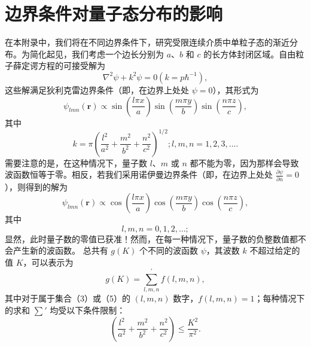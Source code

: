 ﻿\section{边界条件对量子态分布的影响}\label{ux8fb9ux754cux6761ux4ef6ux5bf9ux91cfux5b50ux6001ux5206ux5e03ux7684ux5f71ux54cd}

在本附录中，我们将在不同边界条件下，研究受限连续介质中单粒子态的渐近分布。为简化起见，我们考虑一个边长分别为 \(a\)、\(b\) 和 \(c\) 的长方体封闭区域。自由粒子薛定谔方程的可接受解为
\begin{equation}\tag{17.1.1}\label{eq:17.1.1}
\nabla ^{2} \psi + k ^{2} \psi = 0  \left( k = p \hbar ^{- 1} \right) ,
\end{equation}
这些解满足狄利克雷边界条件（即，在边界上处处 \(\psi=0\)），其形式为
\begin{equation}\tag{17.1.2}\label{eq:17.1.2}
\psi _ { l m n } ( \pmb { r } ) \propto \sin \left( \frac { l \pi x } { a } \right) \sin \left( \frac { m \pi y } { b } \right) \sin \left( \frac { n \pi z } { c } \right) ,
\end{equation}
其中
\begin{equation}\tag{17.1.3}\label{eq:17.1.3}
k = \pi \left( \frac { l ^{2} } { a ^{2} } + \frac { m ^{2} } { b ^{2} } + \frac { n ^{2} } { c ^{2} } \right) ^{1 / 2} ;  l , m , n = 1 , 2 , 3 , \ldots .
\end{equation}
需要注意的是，在这种情况下，量子数 \(l\)、\(m\) 或 \(n\) 都不能为零，因为那样会导致波函数恒等于零。相反，若我们采用诺伊曼边界条件（即，在边界上处处 \(\frac{\partial\psi}{\partial n}=0\)），则得到的解为
\begin{equation}\tag{17.1.4}\label{eq:17.1.4}
\psi _ { l m n } ( \pmb { r } ) \propto \cos \left( \frac { l \pi x } { a } \right) \cos \left( \frac { m \pi y } { b } \right) \cos \left( \frac { n \pi z } { c } \right) ,
\end{equation}
其中
\begin{equation}\tag{17.1.5}\label{eq:17.1.5}
l , m , n = 0 , 1 , 2 , \ldots ;
\end{equation}
显然，此时量子数的零值已获准！然而，在每一种情况下，量子数的负整数值都不会产生新的波函数。
总共有 \(g(K)\) 个不同的波函数 \(\psi\)，其波数 \(k\) 不超过给定的值 \(K\)，可以表示为
\begin{equation}\tag{17.1.6}\label{eq:17.1.6}
g ( K ) = \sum _ { l , m , n } ^{\prime} f ( l , m , n ) ,
\end{equation}
其中对于属于集合（3）或（5）的 \((l,m,n)\) 数字，\(f(l,m,n)=1\)；每种情况下的求和 \(\sum'\) 均受以下条件限制：
\begin{equation}\tag{17.1.7}\label{eq:17.1.7}
\left( \frac { l ^{2} } { a ^{2} } + \frac { m ^{2} } { b ^{2} } + \frac { n ^{2} } { c ^{2} } \right) \leq \frac { K ^{2} } { \pi ^{2} } .
\end{equation}
